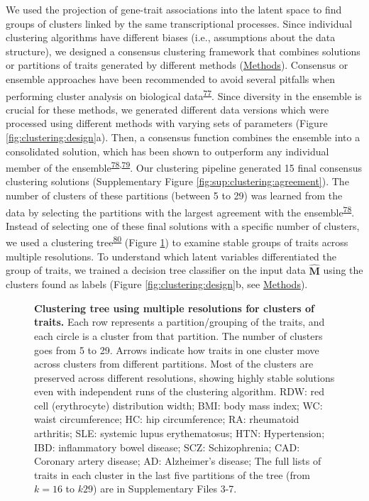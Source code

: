 \documentclass[
  a4paper,
]{article}
\begin{document}
We used the projection of gene-trait associations into the latent space to find groups of clusters linked by the same transcriptional processes.
Since individual clustering algorithms have different biases (i.e., assumptions about the data structure), we designed a consensus clustering framework that combines solutions or partitions of traits generated by different methods (\protect\hyperlink{sec:methods:clustering}{Methods}).
Consensus or ensemble approaches have been recommended to avoid several pitfalls when performing cluster analysis on biological data\textsuperscript{\protect\hyperlink{ref-14dCeRkua}{77}}.
Since diversity in the ensemble is crucial for these methods, we generated different data versions which were processed using different methods with varying sets of parameters (Figure \ref{fig:clustering:design}a).
Then, a consensus function combines the ensemble into a consolidated solution, which has been shown to outperform any individual member of the ensemble\textsuperscript{\protect\hyperlink{ref-uw3AnEgA}{78},\protect\hyperlink{ref-cuROQDFa}{79}}.
Our clustering pipeline generated 15 final consensus clustering solutions (Supplementary Figure \ref{fig:sup:clustering:agreement}).
The number of clusters of these partitions (between 5 to 29) was learned from the data by selecting the partitions with the largest agreement with the ensemble\textsuperscript{\protect\hyperlink{ref-uw3AnEgA}{78}}.
Instead of selecting one of these final solutions with a specific number of clusters, we used a clustering tree\textsuperscript{\protect\hyperlink{ref-xhtEAzx6}{80}} (Figure \ref{fig:clustering:tree}) to examine stable groups of traits across multiple resolutions.
To understand which latent variables differentiated the group of traits, we trained a decision tree classifier on the input data \(\hat{\mathbf{M}}\) using the clusters found as labels (Figure \ref{fig:clustering:design}b, see \protect\hyperlink{sec:methods:clustering}{Methods}).

\begin{figure}
\hypertarget{fig:clustering:tree}{%
\centering

\caption{\textbf{Clustering tree using multiple resolutions for clusters of traits.}
Each row represents a partition/grouping of the traits, and each circle is a cluster from that partition.
The number of clusters goes from 5 to 29.
Arrows indicate how traits in one cluster move across clusters from different partitions.
Most of the clusters are preserved across different resolutions, showing highly stable solutions even with independent runs of the clustering algorithm.
RDW: red cell (erythrocyte) distribution width;
BMI: body mass index;
WC: waist circumference;
HC: hip circumference;
RA: rheumatoid arthritis;
SLE: systemic lupus erythematosus;
HTN: Hypertension;
IBD: inflammatory bowel disease;
SCZ: Schizophrenia;
CAD: Coronary artery disease;
AD: Alzheimer's disease;
The full lists of traits in each cluster in the last five partitions of the tree (from \(k=16\) to \(k29\)) are in Supplementary Files 3-7.}\label{fig:clustering:tree}
}
\end{figure}
\end{document}
